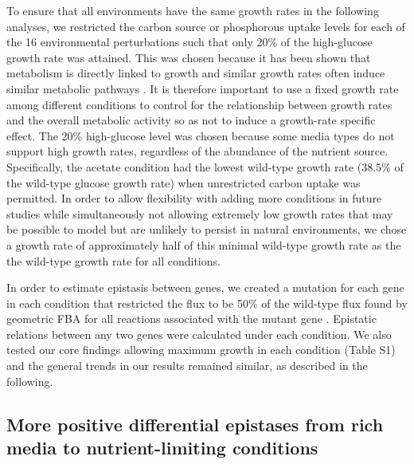 \documentclass[10pt]{article}
\newcommand{\citep}{\cite}
\begin{document}
To ensure that all environments have the same growth
rates in the following analyses, we restricted the carbon source or
phosphorous uptake levels for each of the 16 environmental
perturbations such that only 20\% of the high-glucose growth rate was
attained. This was chosen because it has been shown that metabolism
is directly linked to growth and similar growth rates often induce
similar metabolic pathways \citep{Jakubowska2012}. It is therefore
important to use a fixed growth rate among different conditions to
control for the relationship between growth rates and the overall
metabolic activity so as not to induce a growth-rate specific
effect. The 20\% high-glucose level was chosen because some media
types do not support high growth rates, regardless of the abundance of
the nutrient source. Specifically, the acetate condition had the
lowest wild-type growth rate (38.5\% of the wild-type glucose growth
rate) when unrestricted carbon uptake was permitted. In order to allow
flexibility with adding more conditions in future studies while
simultaneously not allowing extremely low growth rates that may be
possible to model but are unlikely to persist in natural environments,
we chose a growth rate of approximately half of this minimal wild-type
growth rate as the the wild-type growth rate for all conditions.

In order to estimate epistasis between genes, we
created a mutation for each gene in each condition that restricted the
flux to be 50\% of the wild-type flux found by geometric FBA for all
reactions associated with the mutant gene \citep{Xu2012}. Epistatic relations
between any two genes were calculated under each condition. We also
tested our core findings allowing maximum growth in each condition
(Table S1) and the general trends in our results remained similar, as
described in the following.

\subsection*{More positive differential epistases from rich media to
nutrient-limiting conditions}
\end{document}
